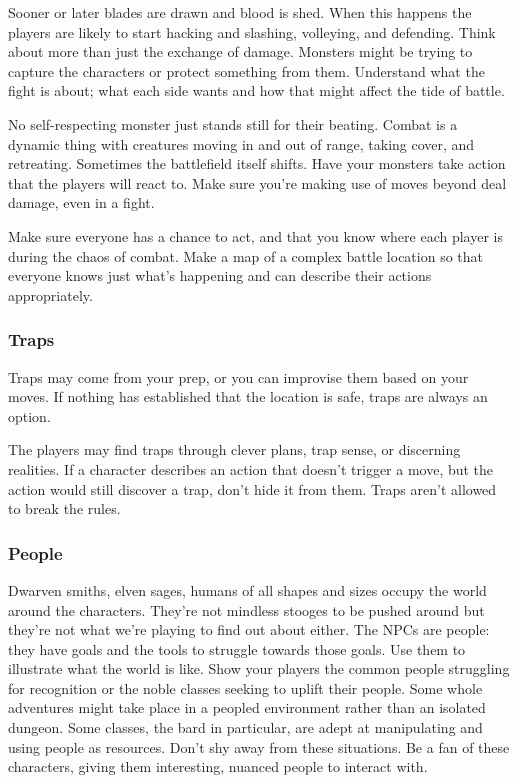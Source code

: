 Sooner or later blades are drawn and blood is shed. When this happens the players are likely to start hacking and slashing, volleying, and defending. Think about more than just the exchange of damage. Monsters might be trying to capture the characters or protect something from them. Understand what the fight is about; what each side wants and how that might affect the tide of battle.

No self-respecting monster just stands still for their beating. Combat is a dynamic thing with creatures moving in and out of range, taking cover, and retreating. Sometimes the battlefield itself shifts. Have your monsters take action that the players will react to. Make sure you're making use of moves beyond deal damage, even in a fight.

Make sure everyone has a chance to act, and that you know where each player is during the chaos of combat. Make a map of a complex battle location so that everyone knows just what's happening and can describe their actions appropriately.
\subsubsection{Traps}


Traps may come from your prep, or you can improvise them based on your moves. If nothing has established that the location is safe, traps are always an option.

The players may find traps through clever plans, trap sense, or discerning realities. If a character describes an action that doesn't trigger a move, but the action would still discover a trap, don't hide it from them. Traps aren't allowed to break the rules.
\subsubsection{People}

Dwarven smiths, elven sages, humans of all shapes and sizes occupy the world around the characters. They're not mindless stooges to be pushed around but they're not what we're playing to find out about either. The NPCs are people: they have goals and the tools to struggle towards those goals. Use them to illustrate what the world is like. Show your players the common people struggling for recognition or the noble classes seeking to uplift their people. Some whole adventures might take place in a peopled environment rather than an isolated dungeon. Some classes, the bard in particular, are adept at manipulating and using people as resources. Don't shy away from these situations. Be a fan of these characters, giving them interesting, nuanced people to interact with.

